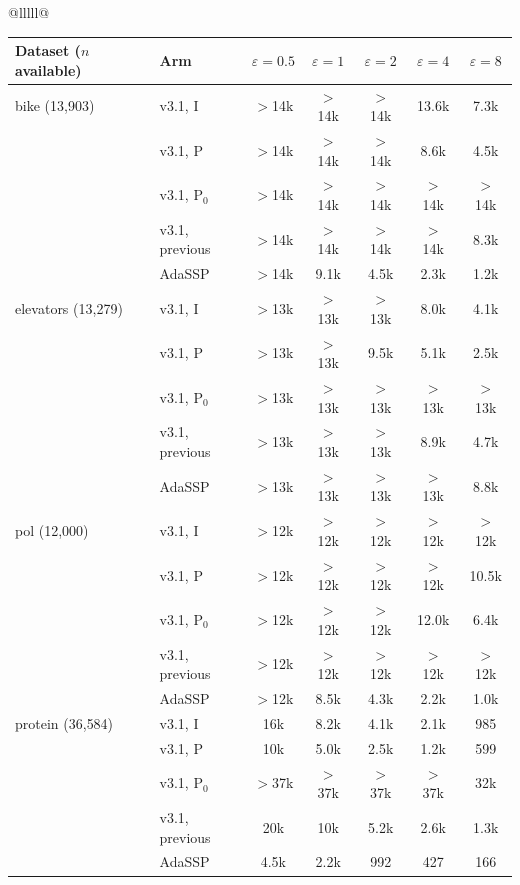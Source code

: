 \begin{tabular}{@{}lllll@{}}
\begin{itemize}[noitemsep]
  \label{tab:sweep_v31}
  \begin{tabular}{@{}llccccc@{}}
    \toprule
    Dataset ($n$ available) & Arm & $\varepsilon = 0.5$ & $\varepsilon = 1$ & $\varepsilon = 2$ & $\varepsilon = 4$ & $\varepsilon = 8$ \\
    \midrule
    bike (13{,}903) & v3.1, I & $>$14k & $>$14k & $>$14k & 13.6k & 7.3k \\
     & v3.1, P & $>$14k & $>$14k & $>$14k & 8.6k & 4.5k \\
     & v3.1, P$_0$ & $>$14k & $>$14k & $>$14k & $>$14k & $>$14k \\
     & v3.1, previous & $>$14k & $>$14k & $>$14k & $>$14k & 8.3k \\
     & AdaSSP & $>$14k & 9.1k & 4.5k & 2.3k & 1.2k \\
    \midrule
    elevators (13{,}279) & v3.1, I & $>$13k & $>$13k & $>$13k & 8.0k & 4.1k \\
     & v3.1, P & $>$13k & $>$13k & 9.5k & 5.1k & 2.5k \\
     & v3.1, P$_0$ & $>$13k & $>$13k & $>$13k & $>$13k & $>$13k \\
     & v3.1, previous & $>$13k & $>$13k & $>$13k & 8.9k & 4.7k \\
     & AdaSSP & $>$13k & $>$13k & $>$13k & $>$13k & 8.8k \\
    \midrule
    pol (12{,}000) & v3.1, I & $>$12k & $>$12k & $>$12k & $>$12k & $>$12k \\
     & v3.1, P & $>$12k & $>$12k & $>$12k & $>$12k & 10.5k \\
     & v3.1, P$_0$ & $>$12k & $>$12k & $>$12k & 12.0k & 6.4k \\
     & v3.1, previous & $>$12k & $>$12k & $>$12k & $>$12k & $>$12k \\
     & AdaSSP & $>$12k & 8.5k & 4.3k & 2.2k & 1.0k \\
    \midrule
    protein (36{,}584) & v3.1, I & 16k & 8.2k & 4.1k & 2.1k & 985 \\
     & v3.1, P & 10k & 5.0k & 2.5k & 1.2k & 599 \\
     & v3.1, P$_0$ & $>$37k & $>$37k & $>$37k & $>$37k & 32k \\
     & v3.1, previous & 20k & 10k & 5.2k & 2.6k & 1.3k \\
     & AdaSSP & 4.5k & 2.2k & 992 & 427 & 166 \\


\end{tabular}
\end{itemize}
\end{tabular}
